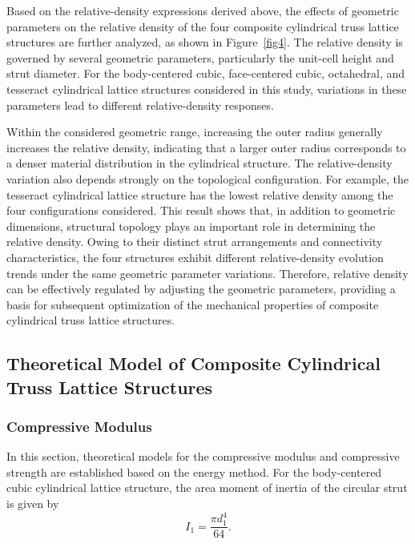 \documentclass[12pt,a4paper]{article}
\begin{document}
Based on the relative-density expressions derived above, the effects of geometric parameters on the relative density of the four composite cylindrical truss lattice structures are further analyzed, as shown in Figure~\ref{fig4}. The relative density is governed by several geometric parameters, particularly the unit-cell height and strut diameter. For the body-centered cubic, face-centered cubic, octahedral, and tesseract cylindrical lattice structures considered in this study, variations in these parameters lead to different relative-density responses.

Within the considered geometric range, increasing the outer radius generally increases the relative density, indicating that a larger outer radius corresponds to a denser material distribution in the cylindrical structure. The relative-density variation also depends strongly on the topological configuration. For example, the tesseract cylindrical lattice structure has the lowest relative density among the four configurations considered. This result shows that, in addition to geometric dimensions, structural topology plays an important role in determining the relative density. Owing to their distinct strut arrangements and connectivity characteristics, the four structures exhibit different relative-density evolution trends under the same geometric parameter variations. Therefore, relative density can be effectively regulated by adjusting the geometric parameters, providing a basis for subsequent optimization of the mechanical properties of composite cylindrical truss lattice structures.

	
	\subsection{Theoretical Model of Composite Cylindrical Truss Lattice Structures}
	
	\subsubsection{Compressive Modulus}
	
	In this section, theoretical models for the compressive modulus and compressive strength are established based on the energy method. For the body-centered cubic cylindrical lattice structure, the area moment of inertia of the circular strut is given by
	\begin{equation}
		I_1 = \frac{\pi d_1^4}{64}.
		\label{Eq8}
	\end{equation}
	
\end{document}
